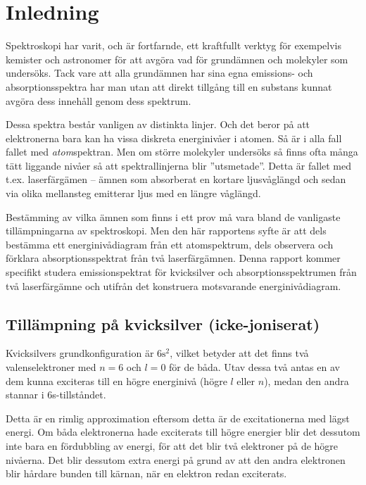 \documentclass[11pt,a4paper]{article}
\begin{document}





\section{Inledning}
Spektroskopi har varit, och är fortfarnde, ett kraftfullt verktyg för
exempelvis kemister och astronomer för att avgöra vad för grundämnen
och molekyler som undersöks. Tack vare att alla grundämnen har sina
egna emissions- och absorptionsspektra har man utan att direkt
tillgång till en substans kunnat avgöra dess innehåll genom dess
spektrum. 

Dessa spektra består vanligen av distinkta linjer. Och det beror på
att elektronerna bara kan ha vissa diskreta energinivåer i atomen. Så
är i alla fall fallet med \emph{atom}spektran. Men om större molekyler
undersöks så finns ofta många tätt liggande nivåer så att
spektrallinjerna blir ''utsmetade''. Detta är fallet med
t.ex. laserfärgämen -- ämnen som absorberat en kortare ljusvåglängd
och sedan via olika mellansteg emitterar ljus med en längre våglängd.

Bestämming av vilka ämnen som finns i ett prov må vara bland de
vanligaste tillämpningarna av spektroskopi. Men den här rapportens
syfte är att dels bestämma ett energinivådiagram från ett
atomspektrum, dels observera och förklara absorptionsspektrat från två
laserfärgämnen.  Denna rapport kommer specifikt studera
emissionspektrat för kvicksilver\footnotemark{} och
absorptionsspektrumen från två laserfärgämne och utifrån det
konstruera motsvarande energinivådiagram. 


\subsection{Tillämpning på kvicksilver (icke-joniserat)}
Kvicksilvers grundkonfiguration är $6\mathrm{s}^2$, vilket betyder att det
finns två valenselektroner med $n=6$ och $l=0$ för de båda. Utav dessa
två antas en av dem kunna exciteras till en högre energinivå (högre
$l$ eller $n$), medan den andra stannar i 6s-tillståndet. 

Detta är en rimlig approximation eftersom detta är de excitationerna
med lägst energi. Om båda elektronerna hade exciterats till högre
energier blir det dessutom inte bara en fördubbling av energi, för att
det blir två elektroner på de högre nivåerna. Det blir dessutom extra
energi på grund av att den andra elektronen blir hårdare bunden till
kärnan, när en elektron redan exciterats. 
\end{document}
